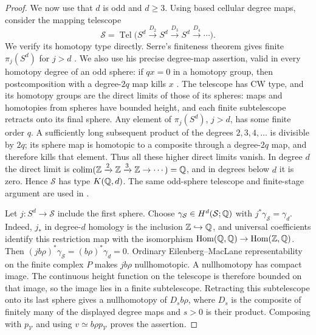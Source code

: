 \begin{proof}
We now use that $d$ is odd and $d\geq3$.  Using based cellular degree
maps, consider the mapping telescope
\begin{equation}
 \mathcal S=\operatorname{Tel}
 \bigl(S^d\xrightarrow{D_2}S^d
       \xrightarrow{D_3}S^d\xrightarrow{D_4}\cdots\bigr).
 \label{top:odd-telescope}
\end{equation}
We verify its homotopy type directly.  Serre's finiteness theorem
gives finite $\pi_j(S^d)$ for $j>d$
\cite[Chapter~V, \S3, Proposition~3]{Serre1951}.
We also use his precise degree-map assertion, valid in every
homotopy degree of an odd sphere:
if $q x=0$ in a homotopy group, then postcomposition with a
degree-$2q$ map kills $x$
\cite[Chapter~V, \S1, Corollary~2 to Proposition~1]{Serre1953}.
The telescope has CW type, and its homotopy groups are the direct
limits of those of its spheres: maps and homotopies from spheres
have bounded height, and each finite subtelescope retracts onto
its final sphere.  Any element of $\pi_j(S^d)$, $j>d$, has some
finite order $q$.  A sufficiently long subsequent product of the
degrees $2,3,4,\ldots$ is divisible by $2q$; its sphere map is
homotopic to a composite through a degree-$2q$ map, and therefore
kills that element.  Thus all these higher direct limits vanish.
In degree $d$ the direct limit is
$\operatorname{colim}(\mathbb Z\xrightarrow{2}\mathbb Z
\xrightarrow{3}\mathbb Z\to\cdots)=\mathbb Q$, and in degrees below $d$
it is zero.  Hence $\mathcal S$ has type $K(\mathbb Q,d)$.
The same odd-sphere telescope and finite-stage argument are used in
\cite[proof of Proposition~4.5, p.~928]{DranishnikovFerryWeinberger2003}.

Let $j:S^d\to\mathcal S$ include the first sphere.  Choose
$\gamma_{\mathcal S}\in H^d(\mathcal S;\mathbb Q)$ with
$j^*\gamma_{\mathcal S}=\gamma_d$.  Indeed, $j_*$ in degree-$d$
homology is the inclusion $\mathbb Z\hookrightarrow\mathbb Q$, and universal
coefficients identify this restriction map with the isomorphism
$\operatorname{Hom}(\mathbb Q,\mathbb Q)\to\operatorname{Hom}(\mathbb Z,\mathbb Q)$.
Then $(jb\rho)^*\gamma_{\mathcal S}=(b\rho)^*\gamma_d=0$.
Ordinary Eilenberg--MacLane representability on the finite complex $P$
makes $jb\rho$ nullhomotopic.  A nullhomotopy has compact image.  The
continuous height function on the telescope is therefore bounded
on that image, so the image lies in a finite subtelescope.
Retracting this subtelescope onto its last sphere gives a
nullhomotopy of $D_s b\rho$, where $D_s$ is the composite of
finitely many of the displayed degree maps and $s>0$ is their
product.  Composing with $p_{\mathcal V}$ and using
$v\simeq b\rho p_{\mathcal V}$ proves the assertion.
\end{proof}

